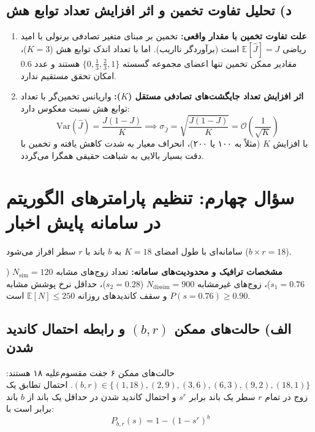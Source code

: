 \documentclass[11pt,a4paper]{article}
\begin{document}
	\subsection{د) تحلیل تفاوت تخمین و اثر افزایش تعداد توابع هش}
	\begin{enumerate}
		\item \textbf{علت تفاوت تخمین با مقدار واقعی:}
		تخمین  بر مبنای متغیر تصادفی برنولی با امید ریاضی $\mathbb{E}[\hat{J}] = J$ است (برآوردگر نااریب). اما با تعداد اندک توابع هش ($K=3$)، مقادیر ممکن تخمین تنها اعضای مجموعه گسسته $\{0, \frac{1}{3}, \frac{2}{3}, 1\}$ هستند و عدد $0.6$ امکان تحقق مستقیم ندارد.
		\item \textbf{اثر افزایش تعداد جایگشت‌های تصادفی مستقل ($K$):}
		واریانس تخمین‌گر با تعداد توابع هش نسبت معکوس دارد:
		\begin{equation}
			\text{Var}(\hat{J}) = \frac{J(1 - J)}{K} \implies \sigma_{\hat{J}} = \sqrt{\frac{J(1 - J)}{K}} = \mathcal{O}\left(\frac{1}{\sqrt{K}}\right)
		\end{equation}
		با افزایش $K$ (مثلاً به ۱۰۰ یا ۲۰۰)، انحراف معیار به شدت کاهش یافته و تخمین با دقت بسیار بالایی به شباهت حقیقی همگرا می‌گردد.
	\end{enumerate}
	
	\newpage
	\section{سؤال چهارم: تنظیم پارامترهای الگوریتم  در سامانه پایش اخبار}
	
	سامانه‌ای با طول امضای $K=18$ به $b$ باند با $r$ سطر افراز می‌شود ($b \times r = 18$).
	
	\textbf{مشخصات ترافیک و محدودیت‌های سامانه:}
	تعداد زوج‌های مشابه $N_{\text{sim}} = 120$ ($s_1 = 0.76$)، زوج‌های غیرمشابه $N_{\text{dissim}} = 900$ ($s_2 = 0.28$)، حداقل نرخ پوشش مشابه $P(s=0.76) \ge 0.90$ و سقف کاندیدهای روزانه $\mathbb{E}[N] \le 250$ است.
	
	\subsection{الف) حالت‌های ممکن $(b, r)$ و رابطه احتمال کاندید شدن}
	حالت‌های ممکن ۶ جفت مقسوم‌علیه ۱۸ هستند: $(b, r) \in \{(1, 18), (2, 9), (3, 6), (6, 3), (9, 2), (18, 1)\}$.
	احتمال تطابق یک زوج در تمام $r$ سطر یک باند برابر $s^r$ و احتمال کاندید شدن در حداقل یک باند از $b$ باند برابر است با:
	\begin{equation}
		P_{b,r}(s) = 1 - (1 - s^r)^b
	\end{equation}
	
\end{document}
